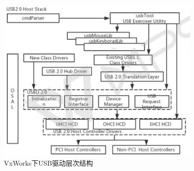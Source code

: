 \begin{figure}[!h]
\centering
\includegraphics[width=0.9\textwidth]{./graphics/VxWorks_USB_kernel_diagram.pdf}
\caption{VxWorks下USB驱动层次结构}\label{fig:VxWorks_USB_kernel_diagram}
\end{figure}

